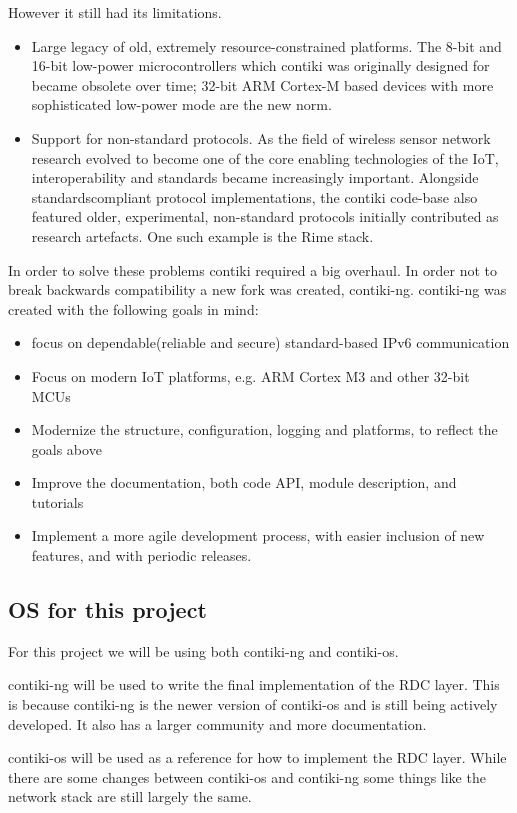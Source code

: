 However it still had its limitations. 
\begin{itemize}
    \item Large legacy of old, extremely resource-constrained platforms. The 8-bit and 16-bit low-power microcontrollers which contiki was originally designed for became obsolete over time; 32-bit ARM Cortex-M based devices with more sophisticated low-power mode are the new norm.
    \item Support for non-standard protocols. As the field of wireless sensor network research evolved to become one of the core enabling technologies of the IoT, interoperability and standards became increasingly important. Alongside standardscompliant protocol implementations, the contiki code-base also featured older, experimental, non-standard protocols initially contributed as research artefacts. One such example is the Rime stack.
\end{itemize}

In order to solve these problems contiki required a big overhaul. In order not to break backwards compatibility a new fork was created, contiki-ng. contiki-ng was created with the following goals in mind:
\begin{itemize}
    \item focus on dependable(reliable  and secure) standard-based IPv6 communication
    \item Focus on modern IoT platforms, e.g. ARM Cortex M3 and other 32-bit MCUs
    \item Modernize the structure, configuration, logging and platforms, to reflect the goals above
    \item Improve the documentation, both code API, module description, and tutorials
    \item Implement a more agile development process, with easier inclusion of new features, and with periodic releases.
\end{itemize}

\subsection{OS for this project}
For this project we will be using both contiki-ng and contiki-os. 

contiki-ng will be used to write the final implementation of the RDC layer. This is because contiki-ng is the newer version of contiki-os and is still being actively developed. It also has a larger community and more documentation.

contiki-os will be used as a reference for how to implement the RDC layer. While there are some changes between contiki-os and contiki-ng some things like the network stack are still largely the same. 


